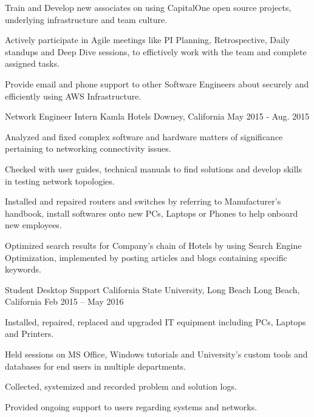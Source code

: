 \begin{cventries}
{\begin{cvitems}
        \item {Train and Develop new associates on using CapitalOne open source projects, underlying infrastructure and team culture.}
        \item {Actively participate in Agile meetings like PI Planning, Retrospective, Daily standups and Deep Dive sessions, to effictively work with the team and complete assigned tasks.}
        \item {Provide email and phone support to other Software Engineers about securely and efficiently using AWS Infrastructure.}
      \end{cvitems}
    }

  \cventry
    {Network Engineer Intern} %
    {Kamla Hotels} %
    {Downey, California} %
    {May 2015 - Aug. 2015} %
    {
      \begin{cvitems} %
        \item {Analyzed and fixed complex software and hardware matters of significance pertaining to networking connectivity issues.}
        \item {Checked with user guides, technical manuals to find solutions and develop skills in testing network topologies.}
        \item {Installed and repaired routers and switches by referring to Manufacturer's handbook, install softwares onto new PCs, Laptops or Phones to help onboard new employees.}
        \item {Optimized search results for Company's chain of Hotels by using Search Engine Optimization, implemented by posting articles and blogs containing specific keywords.}
      \end{cvitems}
    }


  \cventry
    {Student Desktop Support} %
    {California State University, Long Beach} %
    {Long Beach, California} %
    {Feb 2015 – May 2016} %
    {
      \begin{cvitems} %
        \item {Installed, repaired, replaced and upgraded IT equipment including PCs, Laptops and Printers.}
        \item {Held sessions on MS Office, Windows tutorials and University's custom tools and databases for end users in multiple departments.}
        \item {Collected, systemized and recorded problem and solution logs.}
        \item {Provided ongoing support to users regarding systems and networks.}
      \end{cvitems}
    }

\end{cventries}
